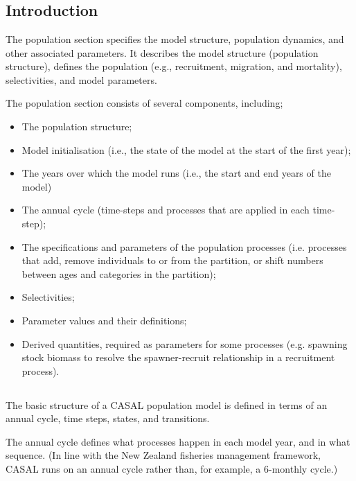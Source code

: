 \section{\label{sec:population-section}}

\subsection{Introduction}

The population section specifies the model structure, population dynamics, and other associated parameters. It describes the model structure (population structure), defines the population  (e.g., recruitment, migration, and mortality), selectivities, and model parameters.

The population section consists of several components, including;
\begin{itemize}
  \item The population structure;
  \item Model initialisation (i.e., the state of the model at the start of the first year);
  \item The years over which the model runs (i.e., the start and end years of the model)
  \item The annual cycle (time-steps and processes that are applied in each time-step);
  \item The specifications and parameters of the population processes (i.e. processes that add, remove individuals to or from the partition, or shift numbers between ages and categories in the partition);
  \item Selectivities;
  \item Parameter values and their definitions;
  \item Derived quantities, required as parameters for some processes (e.g. spawning stock biomass to resolve the spawner-recruit relationship in a recruitment process).
\end{itemize}


\subsection{}

The basic structure of a CASAL population model is defined in terms of an annual cycle, time steps, states, and transitions.

The annual cycle defines what processes happen in each model year, and in what sequence. (In line with the New Zealand fisheries management framework, CASAL runs on an annual cycle rather than, for example, a 6-monthly cycle.) 

